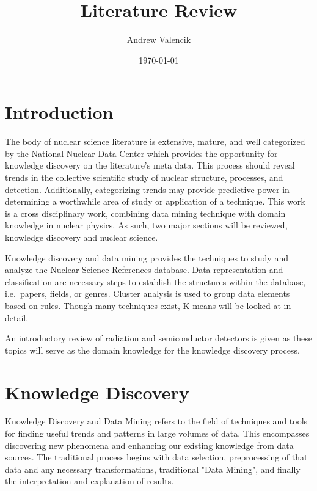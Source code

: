 \documentclass[12pt]{article}
\begin{document}
\title{Literature Review}
\author{Andrew Valencik}
\date{\today}
\maketitle
\tableofcontents
\begin{doublespacing}

\pagebreak
\section{Introduction}

The body of nuclear science literature is extensive, mature, and well categorized by the National Nuclear Data Center \citep{Kurgan200603} which provides the opportunity for knowledge discovery on the literature's meta data.
This process should reveal trends in the collective scientific study of nuclear structure, processes, and detection.
Additionally, categorizing trends may provide predictive power in determining a worthwhile area of study or application of a technique.
This work is a cross disciplinary work, combining data mining technique with domain knowledge in nuclear physics. 
As such, two major sections will be reviewed, knowledge discovery and nuclear science.

Knowledge discovery and data mining provides the techniques to study and analyze the Nuclear Science References database.
Data representation and classification are necessary steps to establish the structures within the database, i.e.\ papers, fields, or genres.
Cluster analysis is used to group data elements based on rules.
Though many techniques exist, K-means will be looked at in detail.

An introductory review of radiation and semiconductor detectors is given as these topics will serve as the domain knowledge for the knowledge discovery process. 


\pagebreak
\section{Knowledge Discovery}
Knowledge Discovery and Data Mining refers to the field of techniques and tools for finding useful trends and patterns in large volumes of data.
This encompasses discovering new phenomena and enhancing our existing knowledge from data sources.
The traditional process begins with data selection, preprocessing of that data and any necessary transformations, traditional "Data Mining", and finally the interpretation and explanation of results.


\end{doublespacing}
\end{document}

